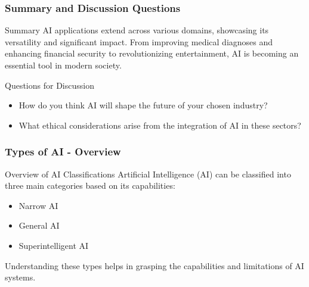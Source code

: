 \documentclass[aspectratio=169]{beamer}
\begin{document}
\begin{frame}[fragile]
    \frametitle{Summary and Discussion Questions}
    \begin{block}{Summary}
        AI applications extend across various domains, showcasing its versatility and significant impact. From improving medical diagnoses and enhancing financial security to revolutionizing entertainment, AI is becoming an essential tool in modern society.
    \end{block}
    
    \begin{block}{Questions for Discussion}
        \begin{itemize}
            \item How do you think AI will shape the future of your chosen industry?
            \item What ethical considerations arise from the integration of AI in these sectors?
        \end{itemize}
    \end{block}
\end{frame}

\begin{frame}[fragile]
    \frametitle{Types of AI - Overview}
    \begin{block}{Overview of AI Classifications}
        Artificial Intelligence (AI) can be classified into three main categories based on its capabilities:
        \begin{itemize}
            \item Narrow AI
            \item General AI
            \item Superintelligent AI
        \end{itemize}
    \end{block}
    Understanding these types helps in grasping the capabilities and limitations of AI systems.
\end{frame}
\end{document}
